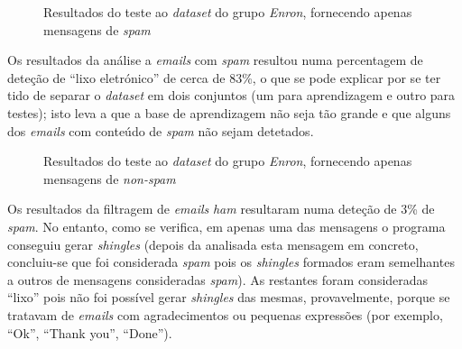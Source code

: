 \documentclass[a4paper,11pt,openright,oneside]{report}
\begin{document}
\begin{figure}[ht]
\center
{}
\caption{Resultados do teste ao \textit{dataset} do grupo \textit{Enron}, fornecendo apenas mensagens de \textit{spam}}
\label{fig:enronspam}
\end{figure}

Os resultados da análise a \textit{emails} com \textit{spam} resultou numa percentagem de deteção de ``lixo eletrónico'' de cerca de 83\%, o que se pode explicar por se ter tido de separar o \textit{dataset} em dois conjuntos (um para aprendizagem e outro para testes); isto leva a que a base de aprendizagem não seja tão grande e que alguns dos \textit{emails} com conteúdo de \textit{spam} não sejam detetados.

\begin{figure}[ht]
\center
{}
\caption{Resultados do teste ao \textit{dataset} do grupo \textit{Enron}, fornecendo apenas mensagens de \textit{non-spam}}
\label{fig:enronnonspam}
\end{figure}

Os resultados da filtragem de \textit{emails} \textit{ham} resultaram numa deteção de 3\% de \textit{spam}. No entanto, como se verifica, em apenas uma das mensagens o programa conseguiu gerar \textit{shingles} (depois da analisada esta mensagem em concreto, concluiu-se que foi considerada \textit{spam} pois os \textit{shingles} formados eram semelhantes a outros de mensagens consideradas \textit{spam}). As restantes foram consideradas ``lixo'' pois não foi possível gerar \textit{shingles} das mesmas, provavelmente, porque se tratavam de \textit{emails} com agradecimentos ou pequenas expressões (por exemplo, ``Ok'', ``Thank you'', ``Done''). 
\end{document}
